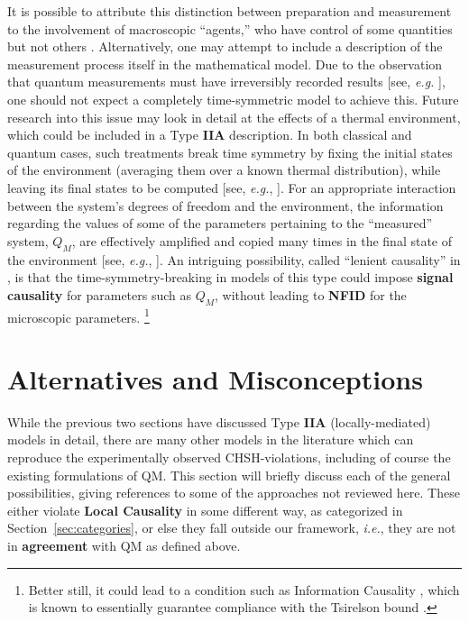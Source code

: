 \documentclass[rmp, aps, preprint, longbibliography]{revtex4-1}
\begin{document}
It is possible to attribute this distinction between preparation and measurement to the involvement of macroscopic ``agents,'' who have control of some quantities but not others \cite{price1997}.  Alternatively, one may attempt to include a description of the measurement process itself in the mathematical model.  Due to the observation that quantum measurements must have irreversibly recorded results [see, \emph{e.g.} \textcite{miller1996}], one should not expect a completely time-symmetric model to achieve this.  Future research into this issue may look in detail at the effects of a thermal environment, which could be included in a Type {\bf IIA} description.  In both classical and quantum cases, such treatments break time symmetry by fixing the initial states of the environment (averaging them over a known thermal distribution), while leaving its final states to be computed [see, \emph{e.g.}, \textcite{feynman1963}].  For an appropriate interaction between the system's degrees of freedom and the environment, the information regarding the values of some of the parameters pertaining to the ``measured'' system, $Q_M$, are effectively amplified and copied many times in the final state of the environment [see, \emph{e.g.}, \textcite{zurek2003}].  An intriguing possibility, called ``lenient causality'' in \textcite{argaman2018}, is that the time-symmetry-breaking in models of this type could impose {\bf signal causality} for parameters such as $Q_M$, without leading to {\bf NFID} for the microscopic parameters.%
\footnote{Better still, it could lead to a condition such as Information Causality \cite{pawlowski2009}, which is known to essentially guarantee compliance with the Tsirelson bound \cite{cirelson1980}.}

\section{Alternatives and Misconceptions}
\label{sec:alternatives}

While the previous two sections have discussed Type {\bf IIA} (locally-mediated) models in detail, there are many other models in the literature which can reproduce the experimentally observed CHSH-violations, including of course the existing formulations of QM\@.  This section will briefly discuss each of the general possibilities, giving references to some of the approaches not reviewed here.  These either violate {\bf Local Causality} in some different way, as categorized in Section~\ref{sec:categories}, or else they fall outside our framework, \emph{i.e.}, they are not in {\bf agreement} with QM as defined above.
\end{document}
